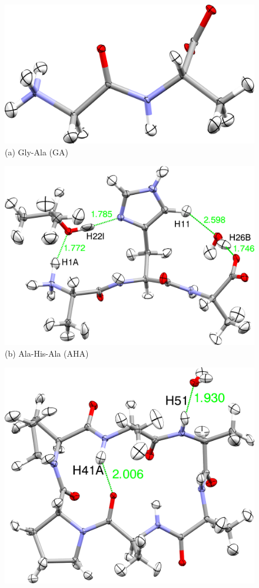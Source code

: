 \documentclass[preprint,dvipsnames]{iucr}              %
\begin{document}
\begin{figure}

 \centering
 
 \begin{minipage}[t]{0.26\linewidth}
  \centering
 \includegraphics[width=1\linewidth]{glyala.png}
 (a) Gly-Ala (GA)
\end{minipage}%
  \begin{minipage}[t]{0.36\linewidth}
 \centering
 \includegraphics[width=1\linewidth]{AHA.png}
 (b) Ala-His-Ala (AHA)
 \end{minipage}%
  \begin{minipage}[t]{0.36\linewidth}
 \centering
 \includegraphics[width=0.9\linewidth]{AAPPAA.png}

\end{minipage}
\end{figure}
\end{document}
